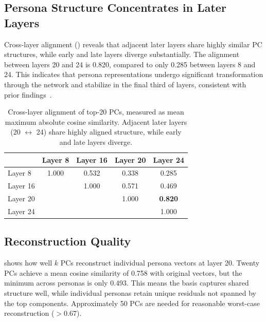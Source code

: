 \subsection{Persona Structure Concentrates in Later Layers}
\label{sec:results_layers}

Cross-layer alignment () reveals that adjacent later layers share highly similar PC structures, while early and late layers diverge substantially. The alignment between layers 20 and 24 is 0.820, compared to only 0.285 between layers 8 and 24. This indicates that persona representations undergo significant transformation through the network and stabilize in the final third of layers, consistent with prior findings~\citep{cintas2025localizing}.

\begin{table}[t]
    \centering
    \caption{Cross-layer alignment of top-20 PCs, measured as mean maximum absolute cosine similarity. Adjacent later layers (20 $\leftrightarrow$ 24) share highly aligned structure, while early and late layers diverge.}
    \begin{tabular}{@{}lcccc@{}}
        \toprule
        & \textbf{Layer 8} & \textbf{Layer 16} & \textbf{Layer 20} & \textbf{Layer 24} \\
        \midrule
        Layer 8  & 1.000 & 0.532 & 0.338 & 0.285 \\
        Layer 16 &       & 1.000 & 0.571 & 0.469 \\
        Layer 20 &       &       & 1.000 & \textbf{0.820} \\
        Layer 24 &       &       &       & 1.000 \\
        \bottomrule
    \end{tabular}
    \label{tab:cross_layer}
\end{table}

\subsection{Reconstruction Quality}
\label{sec:results_reconstruction}

 shows how well $k$ PCs reconstruct individual persona vectors at layer 20. Twenty PCs achieve a mean cosine similarity of 0.758 with original vectors, but the minimum across personas is only 0.493. This means the basis captures shared structure well, while individual personas retain unique residuals not spanned by the top components. Approximately 50 PCs are needed for reasonable worst-case reconstruction ($> 0.67$).

